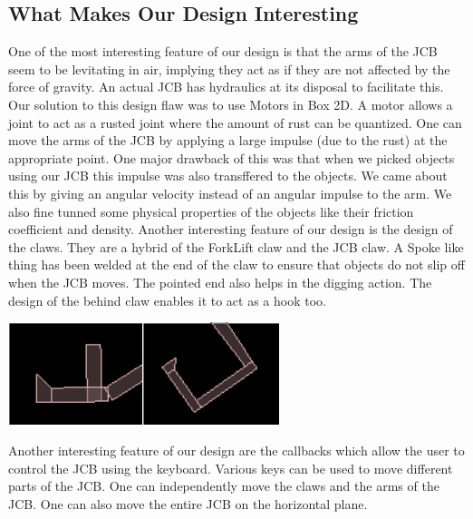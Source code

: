 \documentclass[11pt]{article}
\begin{document}
	\subsection{What Makes Our Design Interesting}
	One of the most interesting feature of our design is that the arms of the JCB seem to be levitating in air, implying they act as if they are not affected by the force of gravity. An actual JCB has hydraulics at its disposal to facilitate this.
 Our solution to this design flaw was to use Motors in Box 2D\cite{motor}. A motor allows a joint to act as a rusted joint where the amount of rust can be quantized. One can move the arms of the JCB by applying a large impulse (due to the rust) at the appropriate point. One major drawback of this was that when we picked objects using our JCB this impulse was also transffered to the objects. We came about this by
giving an angular velocity instead of an angular impulse to the arm. We also fine tunned some physical properties of the objects like their friction coefficient and density.\newline
	Another interesting feature of our design is the design of the claws. They are a hybrid of the ForkLift claw and the JCB claw. A Spoke like thing has been welded at the end of the claw to ensure that objects do not slip off when the JCB moves. The pointed end also helps in the digging action. The design of the behind claw enables it to act as a hook too.
	\begin{center}\includegraphics[height=3cm]{Left_Claw1.png}\includegraphics[height=3cm]{Right_Claw.png}\end{center}	
	Another interesting feature of our design are the callbacks which allow the user to control the JCB using the keyboard.
Various keys can be used to move different parts of the JCB. One can independently move the claws and the arms of the JCB. One can also move the entire JCB on the horizontal plane.
\end{document}
